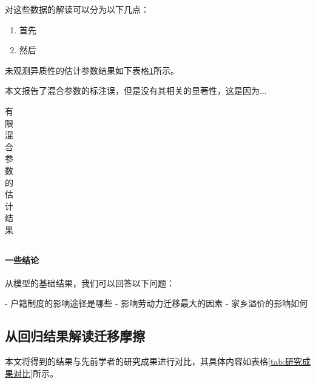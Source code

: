 \documentclass[master, final]{zufe-thesis}
\begin{document}
对这些数据的解读可以分为以下几点：
\begin{enumerate}
  \item 首先
  \item 然后
\end{enumerate}



未观测异质性的估计参数结果如下表格\ref{tab:有限混合参数的估计结果}所示。

本文报告了混合参数的标注误，但是没有其相关的显著性，这是因为...






\begin{table}[!ht]
\centering
\caption{有限混合参数的估计结果}
\begin{tabularx}{\textwidth}{@{}cXXX@{}}
\toprule
\midrule
\bottomrule
\end{tabularx}
\label{tab:有限混合参数的估计结果}
\end{table}




\paragraph{一些结论}

从模型的基础结果，我们可以回答以下问题：

- 户籍制度的影响途径是哪些
- 影响劳动力迁移最大的因素
- 家乡溢价的影响如何


\subsection{从回归结果解读迁移摩擦}
本文将得到的结果与先前学者的研究成果进行对比，其具体内容如表格\ref{tab:研究成果对比}所示。
\end{document}
